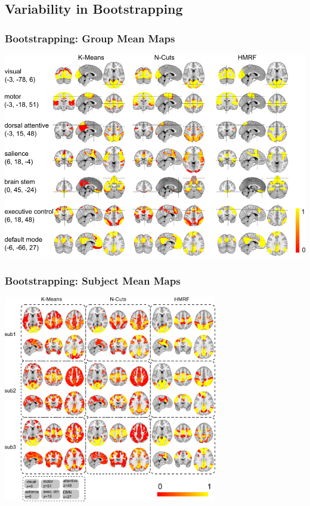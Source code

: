 \documentclass[sansserif, 10pt]{beamer}
\begin{document}
\subsection{Variability in Bootstrapping}
\begin{frame}
\frametitle{Bootstrapping: Group Mean Maps}
\centering
\includegraphics[width = 1\textwidth]{sfig/grp_mean}
\end{frame}


\begin{frame}
\frametitle{Bootstrapping: Subject Mean Maps}
\centering
\includegraphics[width = 0.7\textwidth]{sfig/submean}
\end{frame}
\end{document}
